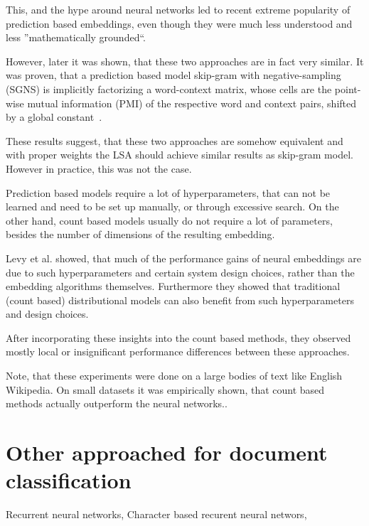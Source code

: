     This, and the hype around neural networks led to recent extreme popularity of prediction based embeddings,
    even though they were much less understood and less ''mathematically grounded``.
    
    However, later it was shown, that these two approaches are in fact very similar.
    It was proven, that a prediction based model skip-gram with negative-sampling (SGNS) 
    is implicitly factorizing a word-context matrix,
    whose cells are the point-wise mutual information (PMI) of the respective word and context pairs, 
    shifted by a global constant~\cite{levy2014neural}. %
    
    These results suggest, that these two approaches are somehow equivalent and with proper weights the LSA should achieve similar results as skip-gram model. 
    However in practice, this was not the case.
    
    Prediction based models require a lot of hyperparameters, that can not be learned and need to be set up manually,
    or through excessive search.
    On the other hand, count based models usually do not require a lot of parameters, besides the number of dimensions of the resulting embedding. 
    
    Levy et al. \cite{levy2015improving} %
    showed, that much  of  the  performance  gains  of  neural embeddings  are  due  to such hyperparameters and certain system design choices, rather than the embedding algorithms themselves. 
    Furthermore they showed that traditional (count based) distributional models
    can also benefit from such hyperparameters and design choices.
    
    After incorporating these insights into the count based methods, 
    they observed mostly local or insignificant performance differences between these approaches.
    
    Note, that these experiments were done on a large bodies of text like English Wikipedia.   
    On small datasets it was empirically shown, that count based methods actually outperform the neural networks.\cite{altszyler2016comparative}. %
    
    \* \cite{naili2017comparative} %

\section{Other approached for document classification}
    
    Recurrent neural networks,
    Character based recurent neural networs, 

\* %